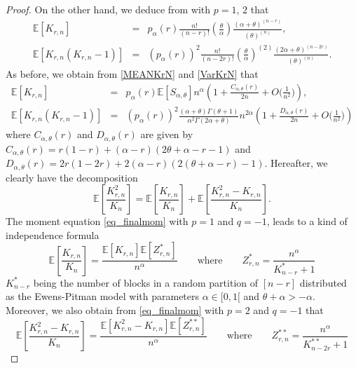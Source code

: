 \documentclass[twoside,12pt]{article}
\newcommand{\E}{\mathds{E}}
\begin{document}
\begin{proof}
On the other hand, we deduce from \citet[Equations 95]{Ber(24)} with $p=1$, $2$ that
\begin{eqnarray}
\label{MEANKrN}
\E[K_{r,n}] &=& p_{\alpha}(r)\frac{n!}{(n-r)!}\left(\frac{\theta}{\alpha}\right)\frac{(\alpha+\theta)^{(n-r)}}{(\theta)^{(n)}}, \\
\E[K_{r,n}(K_{r,n}-1)] &=& (p_{\alpha}(r))^2\frac{n!}{(n-2r)!}\left(\frac{\theta}{\alpha}\right)^{(2)}\frac{(2\alpha+\theta)^{(n-2r)}}{(\theta)^{(n)}}.\label{VarKrN}
\end{eqnarray}
As before, we obtain from \eqref{MEANKrN} and \eqref{VarKrN} that
\begin{eqnarray}
\label{AEMEANKrN}
\E[K_{r,n}] 
&=& p_{\alpha}(r) \E[S_{\alpha, \theta}] n^\alpha \left(1 +\frac{C_{\alpha,\theta}(r)}{2n} + O\Big(\frac{1}{n^2}\Big) \right), \\
\E[K_{r,n}(K_{r,n}-1)] &=& (p_{\alpha}(r))^2\frac{(\alpha+\theta) \Gamma(\theta +1)}{\alpha^2 \Gamma(2\alpha + \theta)}
n^{2\alpha} \left(1 +\frac{D_{\alpha,\theta}(r)}{2n} + O\Big(\frac{1}{n^2}\Big) \right)
\label{AEVarKrN}
\end{eqnarray}
where $C_{\alpha,\theta}(r)$ and $D_{\alpha,\theta}(r)$ are given by $C_{\alpha,\theta}(r)=r(1-r)+(\alpha-r)(2 \theta + \alpha -r-1)$ and $D_{\alpha,\theta}(r)=2r(1-2r)+2(\alpha-r)(2(\theta + \alpha -r)-1)$.
Hereafter, we clearly have the decomposition
\begin{equation}
\label{MAINDECORATIO}
\E\left[\frac{K_{r,n}^{2}}{K_{n}}\right]=\E\left[\frac{K_{r,n}}{K_{n}}\right]+ \E\left[\frac{K_{r,n}^2-K_{r,n}}{K_{n}}\right].
\end{equation}
The moment equation \eqref{eq_finalmom} with $p=1$ and $q=-1$, leads to a kind of independence formula
\begin{equation}\label{RATIO1}
\E\left[\frac{K_{r,n}}{K_{n}}\right]=\frac{\E[K_{r,n}] \E[Z_{r,n}^*]}{n^\alpha}
\qquad\text{where}\qquad Z_{r,n}^*=\frac{n^\alpha}{K^{\ast}_{n-r}+1}
\end{equation}
$K^{\ast}_{n-r}$ being the number of blocks in a random partition of $[n-r]$ distributed as the Ewens-Pitman model with parameters $\alpha\in[0,1[$ and $\theta +\alpha>-\alpha$. Moreover, we also obtain from \eqref{eq_finalmom} with $p=2$ and $q=-1$ that
\begin{equation}\label{RATIO2}
\E\left[\frac{K_{r,n}^2-K_{r,n}}{K_{n}}\right]=\frac{\E[K_{r,n}^2-K_{r,n}]\E[Z_{r,n}^{**}]}{n^\alpha}
\qquad\text{where}\qquad Z_{r,n}^{**}=\frac{n^\alpha}{K^{\ast \ast}_{n-2r}+1}
\end{equation}

\end{proof}
\end{document}
